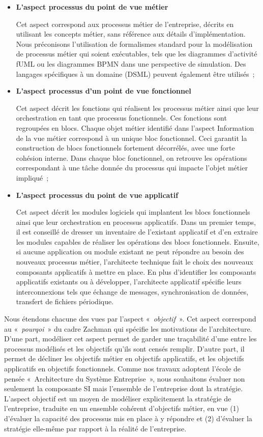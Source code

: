 	\begin{itemize}
	\item \textbf{L'aspect processus du point de vue métier} 
	
	Cet aspect correspond aux processus métier de l'entreprise, décrits en utilisant les concepts métier, sans référence aux détails d'implémentation. Nous préconisons l'utilisation de formalismes standard pour la modélisation de processus métier qui soient exécutables, tels que les diagrammes d'activité fUML ou les diagrammes BPMN dans une perspective de simulation. Des langages spécifiques à un domaine (DSML) peuvent également être utilisés~;
	\item \textbf{L'aspect processus d'un point de vue fonctionnel} 
	
	Cet aspect décrit les fonctions qui réalisent les processus métier ainsi que leur orchestration en tant que processus fonctionnels. Ces fonctions sont regroupées en blocs. Chaque objet métier identifié dans l'aspect Information de la vue métier correspond à un unique bloc fonctionnel. Ceci garantit la construction de blocs fonctionnels fortement décorrélés, avec une forte cohésion interne. Dans chaque bloc fonctionnel, on retrouve les opérations correspondant à une tâche donnée du processus qui impacte l'objet métier impliqué~;
	\item \textbf{L'aspect processus du point de vue applicatif}
	
	Cet aspect décrit les modules logiciels qui implantent les blocs fonctionnels ainsi que leur orchestration en processus applicatifs. Dans un premier temps, il est conseillé de dresser un inventaire de l'existant applicatif et d'en extraire les modules capables de réaliser les opérations des blocs fonctionnels. Ensuite, si aucune application ou module existant ne peut répondre au besoin des nouveaux processus métier, l'architecte technique fait le choix des nouveaux composants applicatifs à mettre en place. En plus d'identifier les composants applicatifs existants ou à développer, l'architecte applicatif spécifie leurs interconnexions tels que échange de messages, synchronisation de données, transfert de fichiers périodique.
	\end{itemize}
	
Nous étendons chacune des vues par l'aspect «~\textit{objectif}~». Cet aspect correspond au «~\textit{pourqoi}~» du cadre Zachman qui spécifie les motivations de l'architecture. D'une part, modéliser cet aspect permet de garder une traçabilité d'une entre les processus modélisés et les objectifs qu'ils sont censés remplir. D'autre part, il permet de décliner les objectifs métier en objectifs applicatifs, et les objectifs applicatifs en objectifs fonctionnels. Comme nos travaux adoptent l'école de pensée «~Architecture du Système Entreprise~», nous souhaitons évaluer non seulement la composante SI mais l'ensemble de l'entreprise dont la stratégie. L'aspect objectif est un moyen de modéliser explicitement la stratégie de l'entreprise, traduite en un ensemble cohérent d'objectifs métier, en vue (1) d'évaluer la capacité des processus mis en place à y répondre et (2) d'évaluer la stratégie elle-même par rapport à la réalité de l'entreprise. 
 
